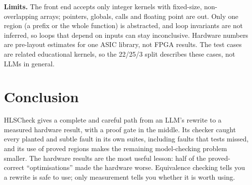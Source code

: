 \documentclass[10pt,a4paper]{article}
\begin{document}
\textbf{Limits.} The front end accepts only integer kernels with fixed-size, non-overlapping arrays;
pointers, globals, calls and floating point are out. Only one region (a prefix or the whole function)
is abstracted, and loop invariants are not inferred, so loops that depend on inputs can stay
inconclusive. Hardware numbers are pre-layout estimates for one ASIC library, not FPGA results. The
test cases are related educational kernels, so the 22/25/3 split describes these cases, not LLMs in
general.

\section{Conclusion}
HLSCheck gives a complete and careful path from an LLM's rewrite to a measured hardware result,
with a proof gate in the middle. Its checker caught every planted and subtle fault in its own
suites, including faults that tests missed, and its use of proved regions makes the remaining
model-checking problem smaller. The hardware results are the most useful lesson: half of the
proved-correct ``optimisations'' made the hardware worse. Equivalence checking tells you a rewrite is
safe to use; only measurement tells you whether it is worth using.
\end{document}
